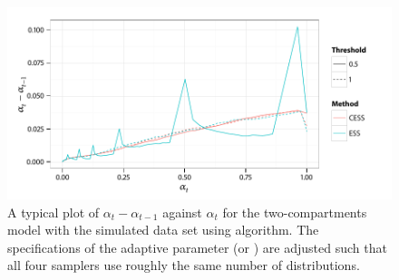 \begin{figure}[t]
  \linespread{1.1}\selectfont
  \includegraphics[width=\linewidth]{fig_src/Adaptive_Dist}
  \caption[Variations of the distribution specification parameter for the
  \protect\pet compartmental model using adaptive \protect\smc algorithms]
  {A typical plot of $\alpha_t - \alpha_{t-1}$ against $\alpha_t$ for the
    two-compartments \pet model with the simulated data set using \smc[2]
    algorithm. The specifications of the adaptive parameter (\ess or \cess)
    are adjusted such that all four samplers use roughly the same number of
    distributions.}
  \label{fig:adaptive_alpha}
\end{figure}
